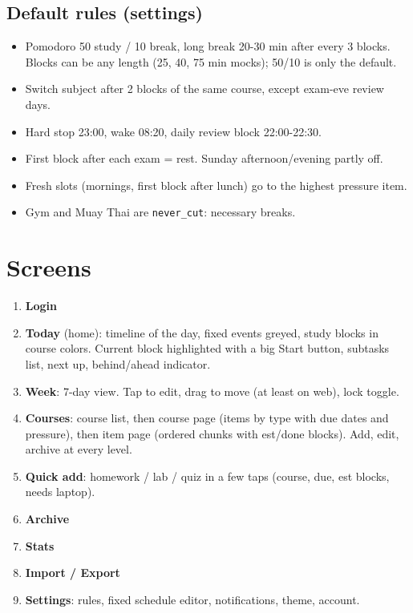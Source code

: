 \documentclass[11pt,a4paper]{article}
\newcommand{\code}[1]{\texttt{\small #1}}
\begin{document}
\subsection*{Default rules (settings)}
\begin{itemize}
  \item Pomodoro 50 study / 10 break, long break 20-30 min after every 3 blocks. Blocks can be any length (25, 40, 75 min mocks); 50/10 is only the default.
  \item Switch subject after 2 blocks of the same course, except exam-eve review days.
  \item Hard stop 23:00, wake 08:20, daily review block 22:00-22:30.
  \item First block after each exam = rest. Sunday afternoon/evening partly off.
  \item Fresh slots (mornings, first block after lunch) go to the highest pressure item.
  \item Gym and Muay Thai are \code{never\_cut}: necessary breaks.
\end{itemize}

\section{Screens}

\begin{enumerate}
  \item \textbf{Login}
  \item \textbf{Today} (home): timeline of the day, fixed events greyed, study blocks in course colors. Current block highlighted with a big Start button, subtasks list, next up, behind/ahead indicator.
  \item \textbf{Week}: 7-day view. Tap to edit, drag to move (at least on web), lock toggle.
  \item \textbf{Courses}: course list, then course page (items by type with due dates and pressure), then item page (ordered chunks with est/done blocks). Add, edit, archive at every level.
  \item \textbf{Quick add}: homework / lab / quiz in a few taps (course, due, est blocks, needs laptop).
  \item \textbf{Archive}
  \item \textbf{Stats}
  \item \textbf{Import / Export}
  \item \textbf{Settings}: rules, fixed schedule editor, notifications, theme, account.
\end{enumerate}
\end{document}
